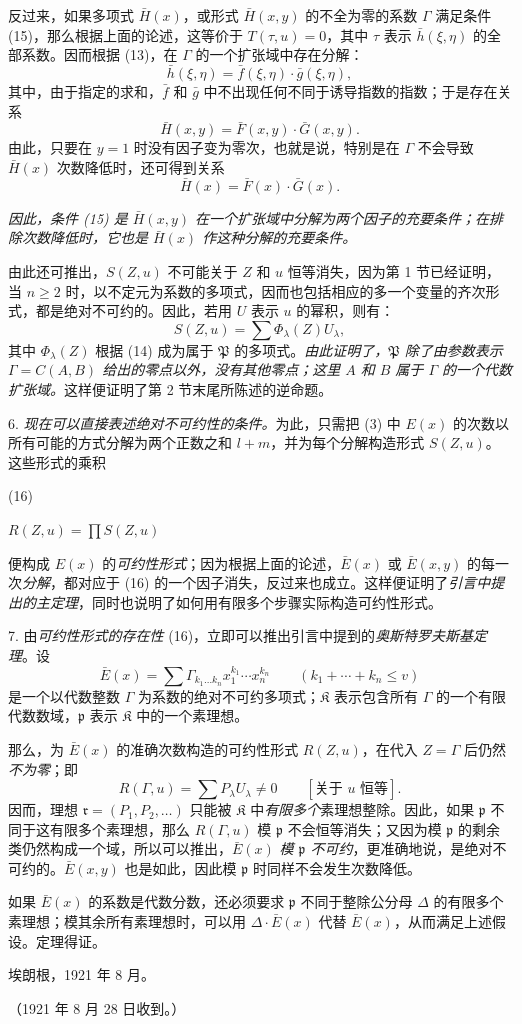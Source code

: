 \documentclass[11pt]{article}
\providecommand{\frK}{\mathfrak K}
\providecommand{\srcnumdisplay}[3][3.4em]{%
  \par\smallskip\noindent
  \begin{minipage}[t]{#1}\vspace*{0pt}#2\end{minipage}%
  \begin{minipage}[t]{\dimexpr\linewidth-#1\relax}\vspace*{0pt}\centering
  \(\displaystyle #3\)
  \end{minipage}\par\smallskip}
\begin{document}
反过来，如果多项式 $\bar H(x)$，或形式 $\bar H(x,y)$ 的不全为零的系数 $\Gamma$ 满足条件 (15)，那么根据上面的论述，这等价于 $T(\tau,u)=0$，其中 $\tau$ 表示 $\bar h(\xi,\eta)$ 的全部系数。因而根据 (13)，在 $\Gamma$ 的一个扩张域中存在分解：
\[
 \bar h(\xi,\eta)=\bar f(\xi,\eta)\cdot\bar g(\xi,\eta),
\]
其中，由于指定的求和，$\bar f$ 和 $\bar g$ 中不出现任何不同于诱导指数的指数；于是存在关系
\[
 \bar H(x,y)=\bar F(x,y)\cdot\bar G(x,y).
\]
由此，只要在 $y=1$ 时没有因子变为零次，也就是说，特别是在 $\Gamma$ 不会导致 $\bar H(x)$ 次数降低时，还可得到关系
\[
 \bar H(x)=\bar F(x)\cdot\bar G(x).
\]

\emph{因此，条件 (15) 是 $\bar H(x,y)$ 在一个扩张域中分解为两个因子的充要条件；在排除次数降低时，它也是 $\bar H(x)$ 作这种分解的充要条件。}

由此还可推出，$S(Z,u)$ 不可能关于 $Z$ 和 $u$ 恒等消失，因为第 1 节已经证明，当 $n\ge2$ 时，以不定元为系数的多项式，因而也包括相应的多一个变量的齐次形式，都是绝对不可约的。因此，若用 $U$ 表示 $u$ 的幂积，则有：
\[
S(Z,u)=\sum \Phi_\lambda(Z)U_\lambda,
\]
其中 $\Phi_\lambda(Z)$ 根据 (14) 成为属于 $\mathfrak P$ 的多项式。\emph{由此证明了，$\mathfrak P$ 除了由参数表示 $\Gamma=C(A,B)$ 给出的零点以外，没有其他零点；这里 $A$ 和 $B$ 属于 $\Gamma$ 的一个代数扩张域。}这样便证明了第 2 节末尾所陈述的逆命题。

6. \emph{现在可以直接表述绝对不可约性的条件。}为此，只需把 (3) 中 $E(x)$ 的次数以所有可能的方式分解为两个正数之和 $l+m$，并为每个分解构造形式 $S(Z,u)$。这些形式的乘积
\srcnumdisplay{(16)}{%
R(Z,u)=\prod S(Z,u)
}
便构成 $E(x)$ 的\emph{可约性形式}；因为根据上面的论述，$\bar E(x)$ 或 $\bar E(x,y)$ 的每一次\emph{分解}，都对应于 (16) 的一个因子消失，反过来也成立。这样便证明了\emph{引言中提出的主定理}，同时也说明了如何用有限多个步骤实际构造可约性形式。

7. 由\emph{可约性形式的存在性} (16)，立即可以推出引言中提到的\emph{奥斯特罗夫斯基定理}。设
\[
 \bar E(x)=\sum \Gamma_{k_1\ldots k_n}x_1^{k_1}\cdots x_n^{k_n}
 \qquad(k_1+\cdots+k_n\le v)
\]
是一个以代数整数 $\Gamma$ 为系数的绝对不可约多项式；$\frK$ 表示包含所有 $\Gamma$ 的一个有限代数数域，$\mathfrak p$ 表示 $\frK$ 中的一个素理想。

那么，为 $\bar E(x)$ 的准确次数构造的可约性形式 $R(Z,u)$，在代入 $Z=\Gamma$ 后仍然\emph{不为零}；即
\[
 R(\Gamma,u)=\sum P_\lambda U_\lambda\ne0\qquad[\text{关于 }u\text{ 恒等}].
\]
因而，理想 $\mathfrak r=(P_1,P_2,\ldots)$ 只能被 $\frK$ 中\emph{有限多个}素理想整除。因此，如果 $\mathfrak p$ 不同于这有限多个素理想，那么 $R(\Gamma,u)$ 模 $\mathfrak p$ 不会恒等消失；又因为模 $\mathfrak p$ 的剩余类仍然构成一个域，所以可以推出，$\bar E(x)$ \emph{模 $\mathfrak p$ 不可约}，更准确地说，是绝对不可约的。$\bar E(x,y)$ 也是如此，因此模 $\mathfrak p$ 时同样不会发生次数降低。

如果 $\bar E(x)$ 的系数是代数分数，还必须要求 $\mathfrak p$ 不同于整除公分母 $\Delta$ 的有限多个素理想；模其余所有素理想时，可以用 $\Delta\cdot\bar E(x)$ 代替 $\bar E(x)$，从而满足上述假设。定理得证。

\begin{flushleft}
埃朗根，1921 年 8 月。
\end{flushleft}
\begin{center}
（1921 年 8 月 28 日收到。）
\end{center}

\clearpage
\end{document}
